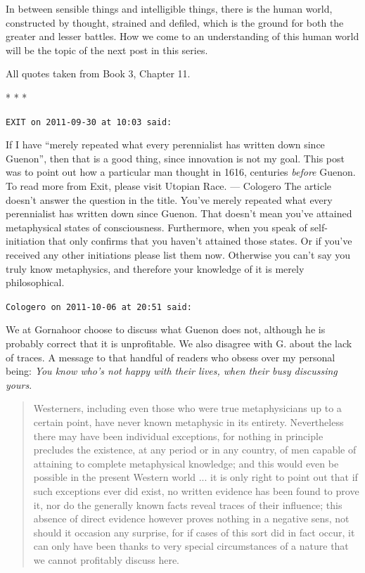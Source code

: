 In between sensible things and intelligible things, there is the human world, constructed by thought, strained and defiled, which is the ground for both the greater and lesser battles. How we come to an understanding of this human world will be the topic of the next post in this series.

All quotes taken from Book 3, Chapter 11.



\begin{center}* * *\end{center}

\begin{footnotesize}
\begin{sffamily}
\texttt{EXIT on 2011-09-30 at 10:03 said:} 

If I have ``merely repeated what every perennialist has written down since Guenon'', then that is a good thing, since innovation is not my goal. This post was to point out how a particular man thought in 1616, centuries \emph{before} Guenon. To read more from Exit, please visit Utopian Race. --- Cologero The article doesn't answer the question in the title. You've merely repeated what every perennialist has written down since Guenon. That doesn't mean you've attained metaphysical states of consciousness. Furthermore, when you speak of self-initiation that only confirms that you haven't attained those states. Or if you've received any other initiations please list them now. Otherwise you can't say you truly know metaphysics, and therefore your knowledge of it is merely philosophical.

\hfill

\texttt{Cologero on 2011-10-06 at 20:51 said:}

We at Gornahoor choose to discuss what Guenon does not, although he is probably correct that it is unprofitable. We also disagree with G. about the lack of traces. A message to that handful of readers who obsess over my personal being: \emph{You know who's not happy with their lives, when their busy discussing yours}.

\begin{quote}\footnotesize

Westerners, including even those who were true metaphysicians up to a certain point, have never known metaphysic in its entirety. Nevertheless there may have been individual exceptions, for nothing in principle precludes the existence, at any period or in any country, of men capable of attaining to complete metaphysical knowledge; and this would even be possible in the present Western world ... it is only right to point out that if such exceptions ever did exist, no written evidence has been found to prove it, nor do the generally known facts reveal traces of their influence; this absence of direct evidence however proves nothing in a negative sens, not should it occasion any surprise, for if cases of this sort did in fact occur, it can only have been thanks to very special circumstances of a nature that we cannot profitably discuss here. 
\end{quote}



\end{sffamily}
\end{footnotesize}
